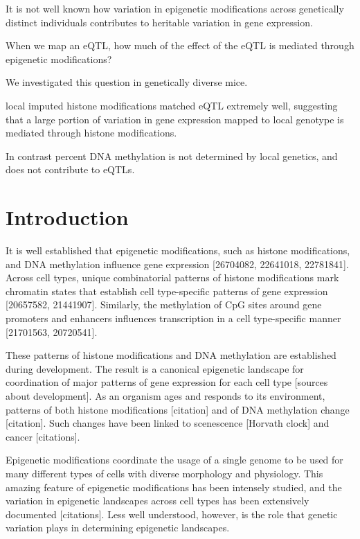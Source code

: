 \documentclass[10pt,letterpaper]{article}
\begin{document}
It is not well known how variation in epigenetic modifications across
genetically distinct individuals contributes to heritable variation in
gene expression.

When we map an eQTL, how much of the effect of the eQTL is mediated
through epigenetic modifications?

We investigated this question in genetically diverse mice.

local imputed histone modifications matched eQTL extremely well,
suggesting that a large portion of variation in gene expression mapped
to local genotype is mediated through histone modifications.

In contrast percent DNA methylation is not determined by local genetics,
and does not contribute to eQTLs.

\hypertarget{introduction}{%
\section{Introduction}\label{introduction}}

It is well established that epigenetic modifications, such as histone
modifications, and DNA methylation influence gene expression
{[}26704082, 22641018, 22781841{]}. Across cell types, unique
combinatorial patterns of histone modifications mark chromatin states
that establish cell type-specific patterns of gene expression
{[}20657582, 21441907{]}. Similarly, the methylation of CpG sites around
gene promoters and enhancers influences transcription in a cell
type-specific manner {[}21701563, 20720541{]}.

These patterns of histone modifications and DNA methylation are
established during development. The result is a canonical epigenetic
landscape for coordination of major patterns of gene expression for each
cell type {[}sources about development{]}. As an organism ages and
responds to its environment, patterns of both histone modifications
{[}citation{]} and of DNA methylation change {[}citation{]}. Such
changes have been linked to scenescence {[}Horvath clock{]} and cancer
{[}citations{]}.

Epigenetic modifications coordinate the usage of a single genome to be
used for many different types of cells with diverse morphology and
physiology. This amazing feature of epigenetic modifications has been
intensely studied, and the variation in epigenetic landscapes across
cell types has been extensively documented {[}citations{]}. Less well
understood, however, is the role that genetic variation plays in
determining epigenetic landscapes.
\end{document}
